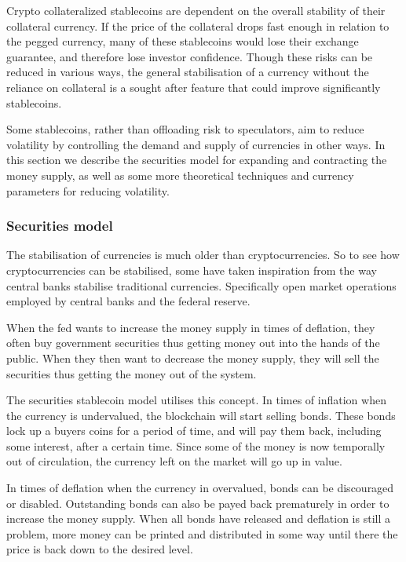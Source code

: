 \documentclass[english,]{IEEEtran}
\begin{document}
Crypto collateralized stablecoins are dependent on the overall stability
of their collateral currency. If the price of the collateral drops fast
enough in relation to the pegged currency, many of these stablecoins
would lose their exchange guarantee, and therefore lose investor
confidence. Though these risks can be reduced in various ways, the
general stabilisation of a currency without the reliance on collateral
is a sought after feature that could improve significantly stablecoins.

Some stablecoins, rather than offloading risk to speculators, aim to
reduce volatility by controlling the demand and supply of currencies in
other ways. In this section we describe the securities model for
expanding and contracting the money supply, as well as some more
theoretical techniques and currency parameters for reducing volatility.

\subsubsection{Securities model}\label{securities-model}

The stabilisation of currencies is much older than cryptocurrencies. So
to see how cryptocurrencies can be stabilised, some have taken
inspiration from the way central banks stabilise traditional currencies.
Specifically open market operations employed by central banks and the
federal reserve.

When the fed wants to increase the money supply in times of deflation,
they often buy government securities thus getting money out into the
hands of the public. When they then want to decrease the money supply,
they will sell the securities thus getting the money out of the system.

The securities stablecoin model utilises this concept. In times of
inflation when the currency is undervalued, the blockchain will start
selling bonds. These bonds lock up a buyers coins for a period of time,
and will pay them back, including some interest, after a certain time.
Since some of the money is now temporally out of circulation, the
currency left on the market will go up in value.

In times of deflation when the currency in overvalued, bonds can be
discouraged or disabled. Outstanding bonds can also be payed back
prematurely in order to increase the money supply. When all bonds have
released and deflation is still a problem, more money can be printed and
distributed in some way until there the price is back down to the
desired level.
\end{document}
